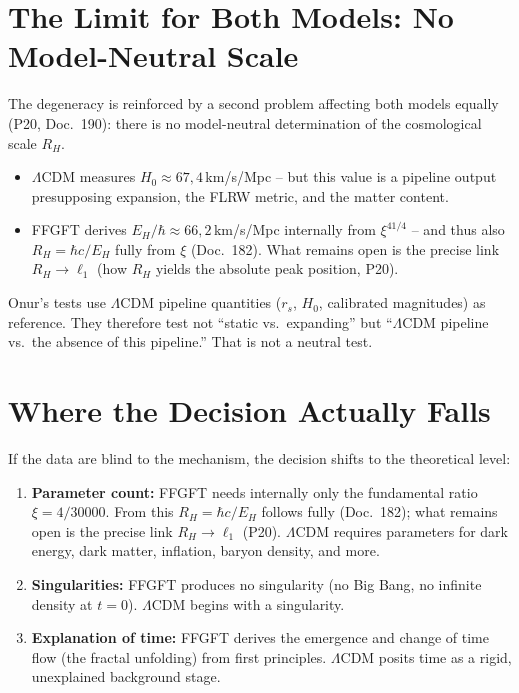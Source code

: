 \section{The Limit for Both Models: No Model-Neutral Scale}

The degeneracy is reinforced by a second problem affecting both models
equally (P20, Doc.~190): there is no model-neutral determination of the
cosmological scale $R_H$.

\begin{itemize}
  \item $\Lambda$CDM measures $H_0 \approx 67{,}4$\,km/s/Mpc -- but this
        value is a pipeline output presupposing expansion, the FLRW metric,
        and the matter content.
  \item FFGFT derives $E_H/\hbar \approx 66{,}2$\,km/s/Mpc internally from
        $\xi^{41/4}$ -- and thus also $R_H = \hbar c/E_H$ fully from $\xi$
        (Doc.~182). What remains open is the precise link $R_H \to \ell_1$
        (how $R_H$ yields the absolute peak position, P20).
\end{itemize}

Onur's tests use $\Lambda$CDM pipeline quantities ($r_s$, $H_0$, calibrated
magnitudes) as reference. They therefore test not ``static vs.\ expanding''
but ``$\Lambda$CDM pipeline vs.\ the absence of this pipeline.'' That is not
a neutral test.

\section{Where the Decision Actually Falls}

If the data are blind to the mechanism, the decision shifts to the
theoretical level:

\begin{enumerate}
  \item \textbf{Parameter count:} FFGFT needs internally only the
        fundamental ratio $\xi = 4/30000$. From this $R_H = \hbar c/E_H$
        follows fully (Doc.~182); what remains open is the precise
        link $R_H \to \ell_1$ (P20). $\Lambda$CDM requires parameters for
        dark energy, dark matter, inflation, baryon density, and more.
  \item \textbf{Singularities:} FFGFT produces no singularity (no Big Bang,
        no infinite density at $t=0$). $\Lambda$CDM begins with a singularity.
  \item \textbf{Explanation of time:} FFGFT derives the emergence and change
        of time flow (the fractal unfolding) from first principles.
        $\Lambda$CDM posits time as a rigid, unexplained background stage.
\end{enumerate}

